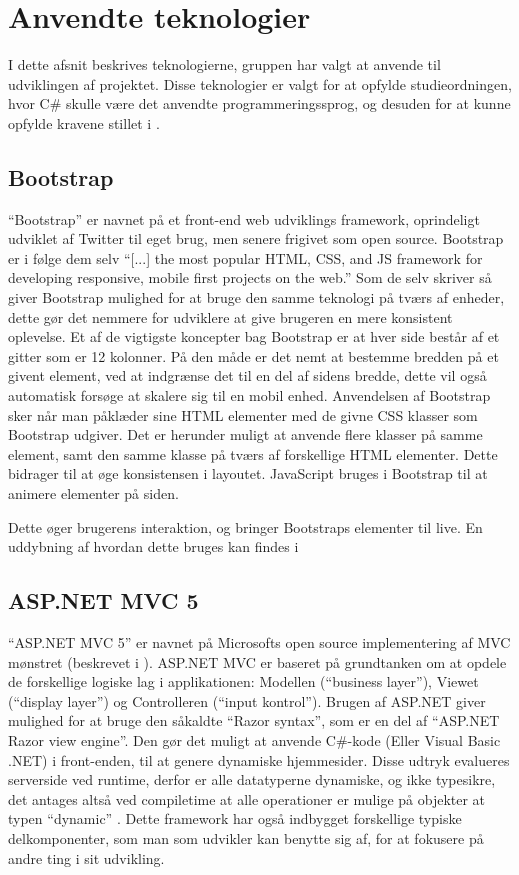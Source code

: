 \section{Anvendte teknologier}
I dette afsnit beskrives teknologierne, gruppen har valgt at anvende til udviklingen af projektet.
Disse teknologier er valgt for at opfylde studieordningen, hvor C\# skulle være det anvendte programmeringssprog, og desuden for at kunne opfylde kravene stillet i .

\subsection{Bootstrap}
``Bootstrap'' er navnet på et front-end web udviklings framework, oprindeligt udviklet af Twitter til eget brug, men senere frigivet som open source.
Bootstrap er i følge dem selv ``[...] the most popular HTML, CSS, and JS framework for developing responsive, mobile first projects on the web.'' \cite{GETBOOTSTRAP}
Som de selv skriver så giver Bootstrap mulighed for at bruge den samme teknologi på tværs af enheder, dette gør det nemmere for udviklere at give brugeren en mere konsistent oplevelse.
Et af de vigtigste koncepter bag Bootstrap er at hver side består af et gitter som er 12 kolonner.
På den måde er det nemt at bestemme bredden på et givent element, ved at indgrænse det til en del af sidens bredde, dette vil også automatisk forsøge at skalere sig til en mobil enhed.
Anvendelsen af Bootstrap sker når man påklæder sine HTML elementer med de givne CSS klasser som Bootstrap udgiver.
Det er herunder muligt at anvende flere klasser på samme element, samt den samme klasse på tværs af forskellige HTML elementer.
Dette bidrager til at øge konsistensen i layoutet.
JavaScript bruges i Bootstrap til at animere elementer på siden.

Dette øger brugerens interaktion, og bringer Bootstraps elementer til live.
En uddybning af hvordan dette bruges kan findes i  \cite{GETBOOTSTRAP}

\subsection{ASP.NET MVC 5}\label{aspnet}
``ASP.NET MVC 5'' er navnet på Microsofts open source implementering af MVC mønstret (beskrevet i ).
ASP.NET MVC er baseret på grundtanken om at opdele de forskellige logiske lag i applikationen: Modellen (``business layer''), Viewet (``display layer'') og Controlleren (``input kontrol'').
Brugen af ASP.NET giver mulighed for at bruge den såkaldte ``Razor syntax'', som er en del af ``ASP.NET Razor view engine''.
Den gør det muligt at anvende C\#-kode (Eller Visual Basic .NET) i front-enden, til at genere dynamiske hjemmesider.
Disse udtryk evalueres serverside ved runtime, derfor er alle datatyperne dynamiske, og ikke typesikre, det antages altså ved compiletime at alle operationer er mulige på objekter at typen ``dynamic'' \citep{UsingTypeDynamic}.
Dette framework har også indbygget forskellige typiske delkomponenter, som man som udvikler kan benytte sig af, for at fokusere på andre ting i sit udvikling.

